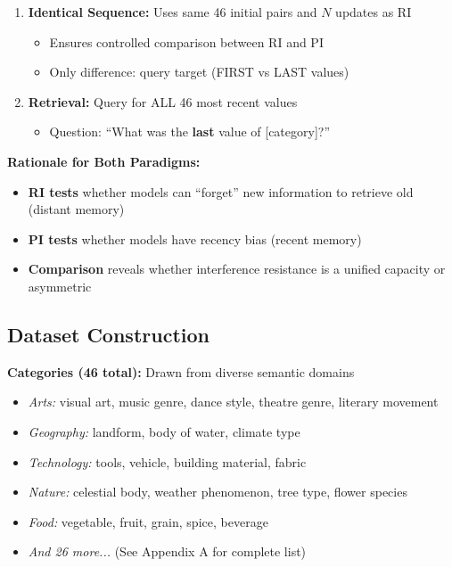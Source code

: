 \documentclass{article}
\begin{document}
\begin{enumerate}
    \item \textbf{Identical Sequence:} Uses same 46 initial pairs and $N$ updates as RI
    \begin{itemize}[itemsep=2pt,topsep=3pt,parsep=0pt]
        \item Ensures controlled comparison between RI and PI
        \item Only difference: query target (FIRST vs LAST values)
    \end{itemize}

    \item \textbf{Retrieval:} Query for ALL 46 most recent values
    \begin{itemize}[itemsep=2pt,topsep=3pt,parsep=0pt]
        \item Question: ``What was the \textbf{last} value of [category]?''
    \end{itemize}
\end{enumerate}

\textbf{Rationale for Both Paradigms:}
\begin{itemize}[itemsep=2pt,topsep=3pt,parsep=0pt]
    \item \textbf{RI tests} whether models can ``forget'' new information to retrieve old (distant memory)
    \item \textbf{PI tests} whether models have recency bias (recent memory)
    \item \textbf{Comparison} reveals whether interference resistance is a unified capacity or asymmetric
\end{itemize}

\subsection{Dataset Construction}

\textbf{Categories (46 total):} Drawn from diverse semantic domains
\begin{itemize}[itemsep=2pt,topsep=3pt,parsep=0pt]
    \item \textit{Arts:} visual art, music genre, dance style, theatre genre, literary movement
    \item \textit{Geography:} landform, body of water, climate type
    \item \textit{Technology:} tools, vehicle, building material, fabric
    \item \textit{Nature:} celestial body, weather phenomenon, tree type, flower species
    \item \textit{Food:} vegetable, fruit, grain, spice, beverage
    \item \textit{And 26 more...} (See Appendix A for complete list)
\end{itemize}
\end{document}
